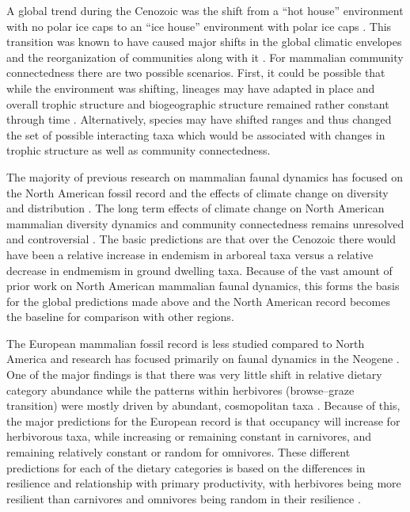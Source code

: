 \documentclass[12pt,letterpaper]{article}
\begin{document}
A global trend during the Cenozoic was the shift from a ``hot house'' environment with no polar ice caps to an ``ice house'' environment with polar ice caps \citep{Zachos2008,Zachos2001}. This transition was known to have caused major shifts in the global climatic envelopes and the reorganization of communities along with it \citep{Janis1993a,Fortelius2002,Blois2009,Alroy2000g,Figueirido2012}. For mammalian community connectedness there are two possible scenarios. First, it could be possible that while the environment was shifting, lineages may have adapted in place and overall trophic structure and biogeographic structure remained rather constant through time \citep{Jernvall2004}. Alternatively, species may have shifted ranges and thus changed the set of possible interacting taxa which would be associated with changes in trophic structure as well as community connectedness.

The majority of previous research on mammalian faunal dynamics has focused on the North American fossil record and the effects of climate change on diversity and distribution \citep{Alroy2000g,Alroy1996a,Alroy1998,Barnosky2001a,Simpson1944,Simpson1953,Badgley2013,Blois2009,Figueirido2012,Gunnell1995,Hadly2001}. The long term effects of climate change on North American mammalian diversity dynamics and community connectedness remains unresolved and controversial \citep{Alroy2000g,Blois2009,Figueirido2012,Barnosky2001a}. The basic predictions are that over the Cenozoic there would have been a relative increase in endemism in arboreal taxa versus a relative decrease in endmemism in ground dwelling taxa. Because of the vast amount of prior work on North American mammalian faunal dynamics, this forms the basis for the global predictions made above and the North American record becomes the baseline for comparison with other regions.

The European mammalian fossil record is less studied compared to North America and research has focused primarily on faunal dynamics in the Neogene \citep{Jernvall2002,Jernvall2004,Liow2008,Raia2006,Raia2005,Raia2011c}. One of the major findings is that there was very little shift in relative dietary category abundance \citep{Jernvall2004} while the patterns within herbivores (browse--graze transition) were mostly driven by abundant, cosmopolitan taxa \citep{Jernvall2002}. Because of this, the major predictions for the European record is that occupancy will increase for herbivorous taxa, while increasing or remaining constant in carnivores, and remaining relatively constant or random for omnivores. These different predictions for each of the dietary categories is based on the differences in resilience and relationship with primary productivity, with herbivores being more resilient than carnivores and omnivores being random in their resilience \citep{Jernvall2004}. 
\end{document}
